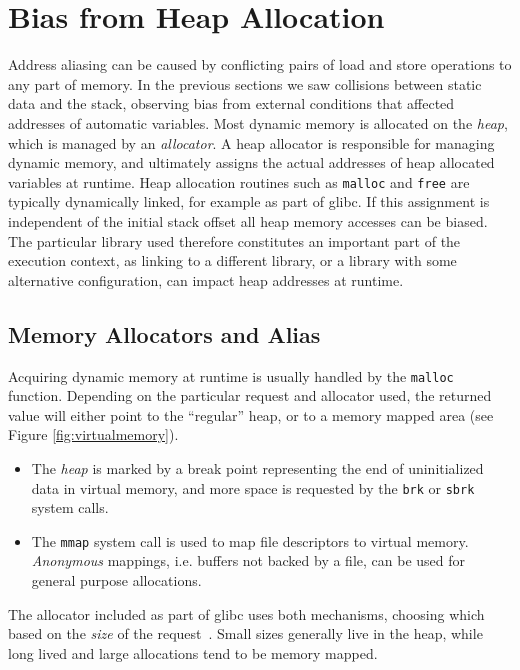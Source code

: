 \documentclass[10pt, conference, compsocconf]{IEEEtran}
\begin{document}
\section{Bias from Heap Allocation}
\label{sec:heap}
Address aliasing can be caused by conflicting pairs of load and store operations to any part of memory.
In the previous sections we saw collisions between static data and the stack, observing bias from external conditions that affected addresses of automatic variables.
Most dynamic memory is allocated on the \emph{heap}, which is managed by an \emph{allocator}.
A heap allocator is responsible for managing dynamic memory, and ultimately assigns the actual addresses of heap allocated variables at runtime.
Heap allocation routines such as \texttt{malloc} and \texttt{free} are typically dynamically linked, for example as part of glibc.
If this assignment is independent of the initial stack offset all heap memory accesses can be biased.
The particular library used therefore constitutes an important part of the execution context, as linking to a different library, or a library with some alternative configuration, can impact heap addresses at runtime.

\subsection{Memory Allocators and Alias}
Acquiring dynamic memory at runtime is usually handled by the \texttt{malloc} function.
Depending on the particular request and allocator used, the returned value will either point to the ``regular'' heap, or to a memory mapped area (see Figure \ref{fig:virtualmemory}).
\begin{itemize}
  \item The \emph{heap} is marked by a break point representing the end of uninitialized data in virtual memory, and more space is requested by the \texttt{brk} or \texttt{sbrk} system calls.
  \item The \texttt{mmap} system call is used to map file descriptors to virtual memory. \emph{Anonymous} mappings, i.e. buffers not backed by a file, can be used for general purpose allocations.
\end{itemize}
The allocator included as part of glibc uses both mechanisms, choosing which based on the \emph{size} of the request~\cite{GlibcManual}.
Small sizes generally live in the heap, while long lived and large allocations tend to be memory mapped.
\end{document}
